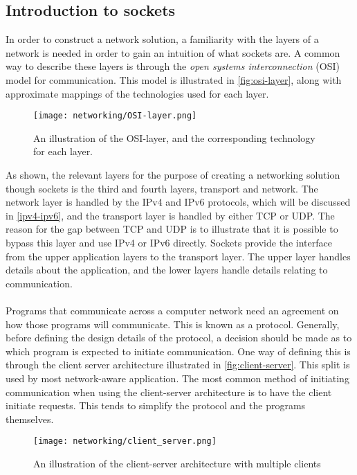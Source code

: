 \subsection{Introduction to sockets}
In order to construct a network solution, a familiarity with the layers of a network is needed in order to gain an intuition of what sockets are.
A common way to describe these layers is through the \textit{open systems interconnection} (OSI) model for communication.
This model is illustrated in \autoref{fig:osi-layer}, along with approximate mappings of the technologies used for each layer.
\begin{figure}[H]
    \centering
    \texttt{[image: networking/OSI-layer.png]}
    \caption{An illustration of the OSI-layer, and the corresponding technology for each layer.}
    \label{fig:osi-layer}
\end{figure}
\noindent
As shown, the relevant layers for the purpose of creating a networking solution though sockets is the third and fourth layers, transport and network.
The network layer is handled by the IPv4 and IPv6 protocols, which will be discussed in \autoref{ipv4-ipv6}, and the transport layer is handled by either TCP or UDP.
The reason for the gap between TCP and UDP is to illustrate that it is possible to bypass this layer and use IPv4 or IPv6 directly\cite{socketnetworking}.
Sockets provide the interface from the upper application layers to the transport layer.
The upper layer handles details about the application, and the lower layers handle details relating to communication.
\\\\
Programs that communicate across a computer network need an agreement on how those programs will communicate.
This is known as a protocol.
Generally, before defining the design details of the protocol, a decision should be made as to which program is expected to initiate communication.
One way of defining this is through the client server architecture illustrated in \autoref{fig:client-server}.
This split is used by most network-aware application\cite{socketnetworking}.
The most common method of initiating communication when using the client-server architecture is to have the client initiate requests.
This tends to simplify the protocol and the programs themselves\cite{socketnetworking}.

\begin{figure}[H]
    \centering
    \texttt{[image: networking/client\_server.png]}
    \caption{An illustration of the client-server architecture with multiple clients}
    \label{fig:client-server}
\end{figure}


